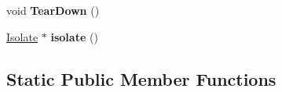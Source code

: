 \begin{DoxyCompactItemize}
\item 
void {\bfseries Tear\+Down} ()\hypertarget{classv8_1_1internal_1_1_global_handles_a08ae35c499746d53695855f3fa478777}{}\label{classv8_1_1internal_1_1_global_handles_a08ae35c499746d53695855f3fa478777}

\item 
\hyperlink{classv8_1_1internal_1_1_isolate}{Isolate} $\ast$ {\bfseries isolate} ()\hypertarget{classv8_1_1internal_1_1_global_handles_af52a3cdd14e9d051a3668250091305b1}{}\label{classv8_1_1internal_1_1_global_handles_af52a3cdd14e9d051a3668250091305b1}

\end{DoxyCompactItemize}
\subsection*{Static Public Member Functions}
